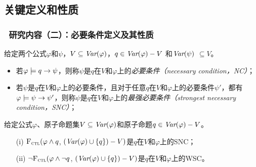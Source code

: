 \documentclass[aspectratio=1610, 9pt, CJK]{beamer}
\begin{document}
\subsection{关键定义和性质}
\begin{frame}
	\frametitle{~研究内容（二）：必要条件定义及其性质}
		\begin{definition}[充分和必要条件]\label{def:NC:SC}
			给定两个公式$\varphi$和$\psi$，$V \subseteq \textit{Var}(\varphi)$，$q\in\textit{Var}(\varphi)- V$
			和$\textit{Var}(\psi)$ $\subseteq V$。
			\begin{itemize}
				\item 若$\varphi \models q \rightarrow \psi$，则称$\psi$是$q$在$V$和$\varphi$上的{\em 必要条件（necessary condition，NC）}；
				\item 若$\psi$是$q$在$V$和$\varphi$上的必要条件，且对于任意$q$在$V$和$\varphi$上的必要条件$\psi'$，都有$\varphi\models\psi\rightarrow\psi'$，则称$\psi$是$q$在$V$和$\varphi$上的{\em 最强必要条件（strongest necessary condition，SNC）}；
			\end{itemize}
		\end{definition}
		\begin{theorem} 
			给定公式$\varphi$、原子命题集$V\subseteq\textit{Var}(\varphi)$和原子命题$q\in\textit{Var}(\varphi)- V$。
			\begin{itemize}
				\item[(i)] ${\textsc{F}_{\textsc{ctl}}} (\varphi \land q$, $(\textit{Var}(\varphi) \cup \{q\}) - V)$是$q$在$V$和$\varphi$上的SNC；
				\item[(ii)]  $\neg{\textsc{F}_{\textsc{ctl}}} (\varphi \land \neg q$, $(\textit{Var}(\varphi) \cup \{q\}) - V)$是$q$在$V$和$\varphi$上的WSC。
			\end{itemize}
		\end{theorem} 
\end{frame}
\end{document}
